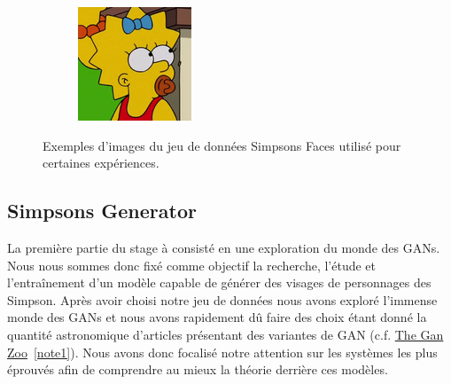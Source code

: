 \documentclass[11pt,francais]{article}
\begin{document}
\begin{figure}[!h]
\begin{subfigure}[b]{0.19\textwidth}
    \end{subfigure}
    \begin{subfigure}[b]{0.19\textwidth}
        \includegraphics[width=\textwidth]{Figures/Simpsons_Dataset/18.png}
    \end{subfigure}
    \caption{Exemples d'images du jeu de données Simpsons Faces utilisé pour certaines expériences.}
    \label{fig:fig1}
\end{figure}

\subsection{Simpsons Generator}
\label{sec:SimpsonsGenerator}
La première partie du stage à consisté en une exploration du monde des GANs. Nous nous sommes donc fixé comme objectif la recherche, l'étude et l'entraînement d'un modèle capable de générer des visages de personnages des Simpson.
Après avoir choisi notre jeu de données nous avons exploré l'immense monde des GANs et nous avons rapidement dû faire des choix étant donné la quantité astronomique d'articles présentant des variantes de GAN (c.f. \href{https://github.com/hindupuravinash/the-gan-zoo}{The Gan Zoo}~\ref{note1}).
Nous avons donc focalisé notre attention sur les systèmes les plus éprouvés afin de comprendre au mieux la théorie derrière ces modèles.
\end{document}

